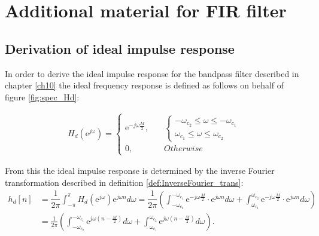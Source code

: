 \chapter{Additional material for FIR filter}

\section{Derivation of ideal impulse response}\label{appC}
In order to derive the ideal impulse response for the bandpass filter described in chapter \ref{ch10} the ideal frequency response is defined as follows on behalf of figure \ref{fig:spec_Hd}:

\begin{align*}
H_d(\text{e}^{j\omega}) = \begin{cases}
\text{e}^{-j\omega\frac{M}{2}}, \quad &\begin{cases}
-\omega_{c_2} \leq \omega \leq -\omega_{c_1} \\
\omega_{c_1} \leq \omega \leq \omega_{c_2}
\end{cases} \\
0, \quad &Otherwise
\end{cases}
\end{align*}

From this the ideal impulse response is determined by the inverse Fourier transformation described in definition \ref{def:InverseFourier_trans}:
\begin{align*}
h_d[n] &= \dfrac{1}{2\pi} \int_{-\pi}^\pi H_d(\text{e}^{j\omega}) \text{e}^{j\omega n} d\omega = \dfrac{1}{2\pi} \left(  \int_{-\omega_{c_2}}^{-\omega_{c_1}} \text{e}^{-j\omega \frac{M}{2}} \cdot \text{e}^{j \omega n} d\omega + \int_{\omega_{c_1}}^{\omega_{c_2}} \text{e}^{-j\omega \frac{M}{2}} \cdot \text{e}^{j \omega n} d\omega \right) \\
&= \frac{1}{2\pi} \left( \int_{-\omega_{c_2}}^{-\omega_{c_1}} \text{e}^{j\omega \left(n - \frac{M}{2} \right) } d\omega + \int_{\omega_{c_1}}^{\omega_{c_2}} \text{e}^{j\omega \left(n- \frac{M}{2} \right)} d\omega \right).
\end{align*}

